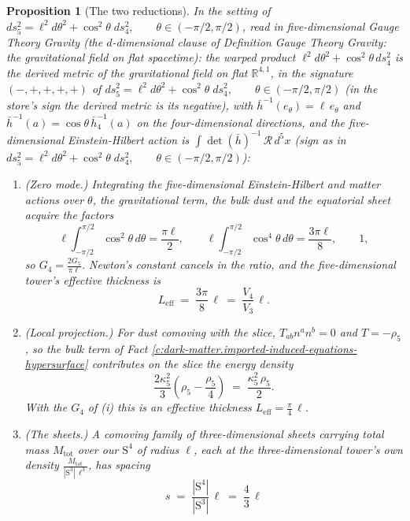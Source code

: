 \documentclass[11pt]{article}
\newtheorem{proposition}[theorem]{Proposition}
\theoremstyle{definition}
\theoremstyle{plain}
\newcommand{\changedmark}[2]{\marginpar{\raggedright\scriptsize\color{#1}#2}}
\providecommand{\R}{}\renewcommand{\R}{\mathbb{R}}
\providecommand{\Sph}{}\renewcommand{\Sph}{\mathrm{S}}
\providecommand{\hb}{}\renewcommand{\hb}{\bar{h}}
\begin{document}
\begin{proposition}[The two reductions]\label{c:dark-matter.two-reductions}
\changedmark{gray}{reworded}
In the setting of $ds_{5}^{2} = \ell^{2}d\theta^{2} + \cos^{2}\theta\; ds_{4}^{2}, \qquad \theta \in (-\pi/2, \pi/2)$, read in five-dimensional Gauge Theory Gravity (the $d$-dimensional clause of Definition \emph{Gauge Theory Gravity: the gravitational field on flat spacetime}): the warped product $\ell^{2}d\theta^{2} + \cos^{2}\theta\,ds_{4}^{2}$ is the derived metric of the gravitational field on flat $\R^{4,1}$, in the signature $(-,+,+,+,+)$ of $ds_{5}^{2} = \ell^{2}d\theta^{2} + \cos^{2}\theta\; ds_{4}^{2}, \qquad \theta \in (-\pi/2, \pi/2)$ (in the store's sign the derived metric is its negative), with $\hb^{-1}(e_\theta) = \ell\,e_\theta$ and $\hb^{-1}(a) = \cos\theta\,\hb_{4}^{-1}(a)$ on the four-dimensional directions, and the five-dimensional Einstein-Hilbert action is $\int \det(\hb)^{-1}\,\mathcal{R}\,d^{5}x$ (sign as in $ds_{5}^{2} = \ell^{2}d\theta^{2} + \cos^{2}\theta\; ds_{4}^{2}, \qquad \theta \in (-\pi/2, \pi/2)$):
\begin{enumerate}
\item[(i)] (Zero mode.) Integrating the five-dimensional Einstein-Hilbert and matter actions over $\theta$, the gravitational term, the bulk dust and the equatorial sheet acquire the factors
\[
\ell\int_{-\pi/2}^{\pi/2}\cos^{2}\theta\,d\theta = \frac{\pi\ell}{2}, \qquad
\ell\int_{-\pi/2}^{\pi/2}\cos^{4}\theta\,d\theta = \frac{3\pi\ell}{8}, \qquad 1,
\]
so $G_{4} = \frac{2G_{5}}{\pi\ell}$. Newton's constant cancels in the ratio, and the five-dimensional tower's effective thickness is
\[
L_{\mathrm{eff}} \;=\; \frac{3\pi}{8}\,\ell \;=\; \frac{V_{4}}{V_{3}}\,\ell .
\]
\item[(ii)] (Local projection.) For dust comoving with the slice, $T_{ab}n^{a}n^{b} = 0$ and $T = -\rho_{5}$, so the bulk term of Fact \ref{c:dark-matter.imported-induced-equations-hypersurface} contributes on the slice the energy density
\[
\frac{2\kappa_{5}^{2}}{3}\left(\rho_{5} - \frac{\rho_{5}}{4}\right) \;=\; \frac{\kappa_{5}^{2}\,\rho_{5}}{2} .
\]
With the $G_{4}$ of (i) this is an effective thickness $L_{\mathrm{eff}} = \frac{\pi}{4}\,\ell$.
\item[(iii)] (The sheets.) A comoving family of three-dimensional sheets carrying total mass $M_{\mathrm{tot}}$ over our $\Sph^{4}$ of radius $\ell$, each at the three-dimensional tower's own density $\frac{M_{\mathrm{tot}}}{|\Sph^{3}|\,\ell^{3}}$, has spacing
\[
s \;=\; \frac{|\Sph^{4}|}{|\Sph^{3}|}\,\ell \;=\; \frac{4}{3}\,\ell
\]
\end{enumerate}
\end{proposition}
\end{document}
